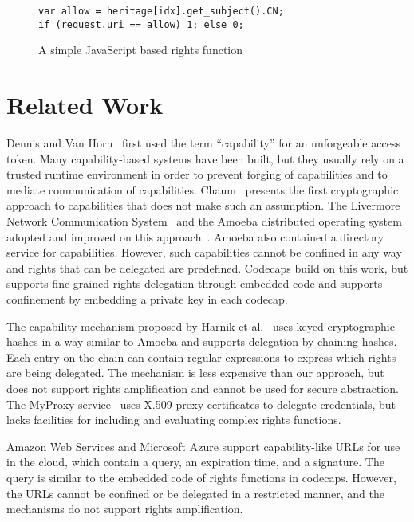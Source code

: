\documentclass[10pt, conference, compsocconf]{IEEEtran}
\begin{document}
\begin{figure}
\small
\begin{verbatim}
var allow = heritage[idx].get_subject().CN;
if (request.uri == allow) 1; else 0;
\end{verbatim}
  \caption{A simple JavaScript based rights function}
  \label{fig:javascript1}
\end{figure}


\section{Related Work}

Dennis and Van Horn~\cite{DvH66} first used the term ``capability''
for an unforgeable access token.  Many capability-based systems
have been built, but they usually rely on a trusted runtime environment
in order to prevent forging of capabilities and to mediate communication
of capabilities.  Chaum~\cite{CF78} presents the first cryptographic
approach to capabilities that does not make such an assumption.
The Livermore Network Communication System~\cite{Don81} and the
Amoeba distributed operating system~\cite{MT86} adopted and
improved on this approach~\cite{TMvR86}.  Amoeba also contained a
directory service for capabilities.  However, such capabilities
cannot be confined in any way and rights that can be delegated are
predefined.  Codecaps build on this work, but supports fine-grained
rights delegation through embedded code and supports confinement by
embedding a private key in each codecap.

The capability mechanism proposed by Harnik et al.~\cite{Harnik2011}
uses keyed cryptographic hashes in a way similar to Amoeba and
supports delegation by chaining hashes.  Each entry on the chain
can contain regular expressions to express which rights are being
delegated.  The mechanism is less expensive than our approach,
but does not support rights amplification and cannot be used for
secure abstraction.  The MyProxy service~\cite{Basney2005:MyProxy}
uses X.509 proxy certificates to delegate credentials, but
lacks facilities for including and evaluating complex rights
functions.

Amazon Web Services and Microsoft Azure support capability-like URLs
for use in the
cloud, which contain a query, an expiration time, and a signature.
The query is similar
to the embedded code of rights functions in codecaps.  However, the
URLs cannot be confined or be delegated in a restricted manner, and
the mechanisms do not support rights amplification.
\end{document}

